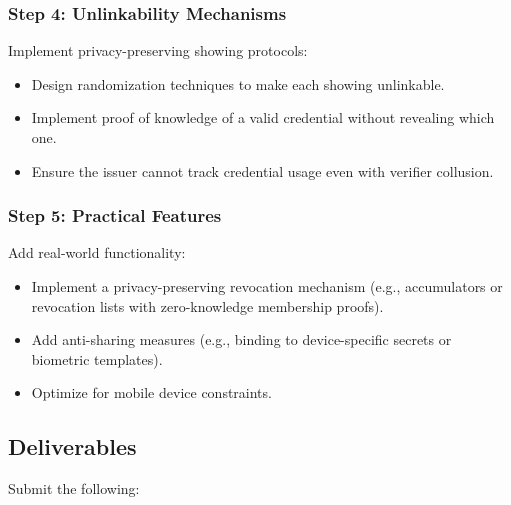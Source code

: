 \documentclass[10pt,a4paper,american]{exam}
\begin{document}
\subsubsection*{Step 4: Unlinkability Mechanisms}
Implement privacy-preserving showing protocols:
\begin{itemize}
	\item Design randomization techniques to make each showing unlinkable.
	\item Implement proof of knowledge of a valid credential without revealing which one.
	\item Ensure the issuer cannot track credential usage even with verifier collusion.
\end{itemize}

\subsubsection*{Step 5: Practical Features}
Add real-world functionality:
\begin{itemize}
	\item Implement a privacy-preserving revocation mechanism (e.g., accumulators or revocation lists with zero-knowledge membership proofs).
	\item Add anti-sharing measures (e.g., binding to device-specific secrets or biometric templates).
	\item Optimize for mobile device constraints.
\end{itemize}

\subsection*{Deliverables}
Submit the following:
\end{document}
